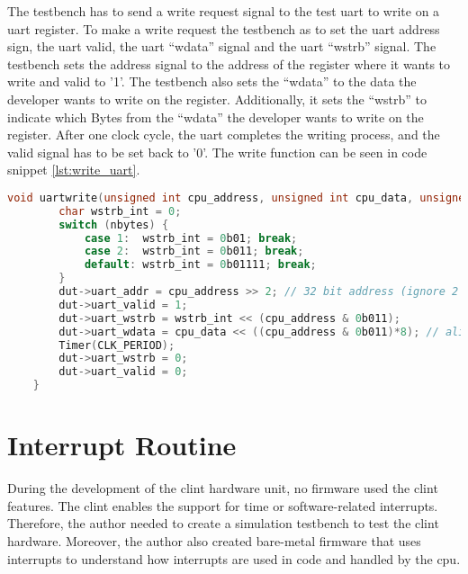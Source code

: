 The testbench has to send a write request signal to the test \acrshort{uart} to write on a \acrshort{uart} register. To make a write request the testbench as to set the \acrshort{uart} address sign, the \acrshort{uart} valid, the \acrshort{uart} \enquote{wdata} signal and the \acrshort{uart} \enquote{wstrb} signal. The testbench sets the address signal to the address of the register where it wants to write and valid to '1'. The testbench also sets the \enquote{wdata} to the data the developer wants to write on the register. Additionally, it sets the \enquote{wstrb} to indicate which Bytes from the \enquote{wdata} the developer wants to write on the register. After one clock cycle, the \acrshort{uart} completes the writing process, and the valid signal has to be set back to '0'. The write function can be seen in code snippet \ref{lst:write_uart}.

\begin{lstlisting}[language=C, caption={Write to the test \acrshort{uart}.}, label=lst:write_uart]
    void uartwrite(unsigned int cpu_address, unsigned int cpu_data, unsigned int nbytes){
        char wstrb_int = 0;
        switch (nbytes) {
            case 1:  wstrb_int = 0b01; break;
            case 2:  wstrb_int = 0b011; break;
            default: wstrb_int = 0b01111; break;
        }
        dut->uart_addr = cpu_address >> 2; // 32 bit address (ignore 2 LSBs)
        dut->uart_valid = 1;
        dut->uart_wstrb = wstrb_int << (cpu_address & 0b011);
        dut->uart_wdata = cpu_data << ((cpu_address & 0b011)*8); // align data to 32 bits
        Timer(CLK_PERIOD);
        dut->uart_wstrb = 0;
        dut->uart_valid = 0;
    }
\end{lstlisting}

\section{Interrupt Routine}
\label{section:barebones_interrupt_routine}
During the development of the \acrshort{clint} hardware unit, no firmware used the \acrshort{clint} features. The \acrshort{clint} enables the support for time or software-related interrupts. Therefore, the author needed to create a simulation testbench to test the \acrshort{clint} hardware. Moreover, the author also created bare-metal firmware that uses interrupts to understand how interrupts are used in code and handled by the \acrshort{cpu}.


